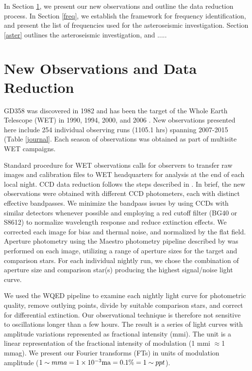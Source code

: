 \documentclass[12pt,preprint]{aastex}
\begin{document}
In Section \ref{data}, we present our new observations and outline the data reduction process.  
In Section \ref{freq}, we establish the framework for frequency identification, and present the 
list of frequencies used for the asteroseismic investigation.  Section \ref{aster} outlines the 
asteroseismic investigation, and .....

\section {New Observations and Data Reduction}\label{data}

GD358 was discovered in 1982 \citep{Winget82} and has been the target of the Whole 
Earth Telescope (WET) in 1990, 1994, 2000, and 2006 \citep{Provencal09, Kepler03,Winget94}. 
New observations presented here include 254 individual observing runs (1105.1 hrs) spanning 
2007-2015 (Table \ref{journal}. Each season of observations was obtained as part of 
multisite WET campaigns. 

Standard procedure for WET observations calls for observers to transfer raw images and 
calibration files to WET headquarters for analysis at the end of each local night. CCD 
data reduction follows the steps described in \citet{Provencal12}. In brief, the new observations 
were obtained with different CCD photometers, each with distinct effective bandpasses. 
We minimize the bandpass issues by using CCDs with similar detectors whenever possible and 
employing a red cutoff filter (BG40 or S8612) to normalize wavelength response and 
reduce extinction effects. We corrected each image for bias and thermal noise, and 
normalized by the flat field. Aperture photometry using the Maestro photometry pipeline 
described by \citet{Dalessio10} was performed on each image, utilizing a range of 
aperture sizes for the target and comparison stars. For each individual nightly run, we 
chose the combination of aperture size and comparison star(s) producing the highest 
signal/noise light curve. 

We used the WQED pipeline \citet{wqed} to examine each nightly light curve for photometric 
quality, remove outlying points, divide by suitable comparison stars, and correct for 
differential extinction. Our observational technique is therefore not sensitive to 
oscillations longer than a few hours. The result is a series of light curves 
with amplitude variations represented as fractional intensity (mmi). The unit is a linear 
representation of the fractional intensity of modulation (1 mmi $\approx$1 mmag). We present
our Fourier transforms (FTs) in units of modulation amplitude 
($1\sim mma=1 \times 10^{-3} {\rm ma} = 0.1 \% = 1\sim ppt$).
\end{document}
